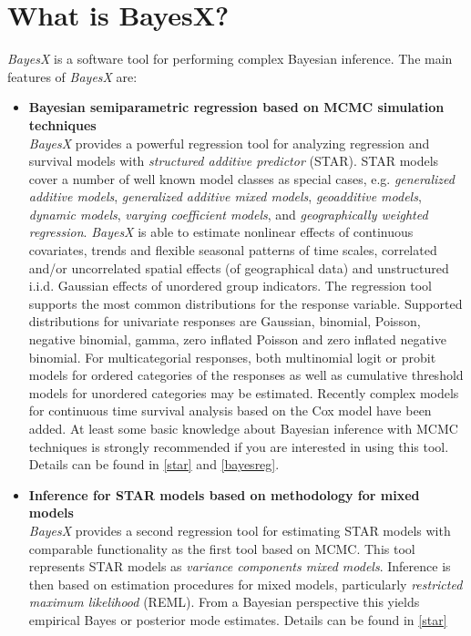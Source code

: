 \chapter{What is BayesX?}

{\em BayesX} is a software tool for performing complex Bayesian
inference. The main features of {\em BayesX} are:
\begin{itemize}
\item {\bf Bayesian semiparametric regression based on MCMC simulation techniques} \\
{\em BayesX} provides a powerful regression tool for analyzing
regression and survival models with {\em structured additive
predictor} (STAR). STAR models cover a number of well known model
classes as special cases, e.g. {\em generalized additive models},
{\em generalized additive mixed models}, {\em geoadditive models},
{\em dynamic models}, {\em varying coefficient models}, and {\em
geographically weighted regression}. {\em BayesX} is able to
estimate nonlinear effects of continuous covariates, trends and
flexible seasonal patterns of time scales, correlated and/or
uncorrelated spatial effects (of geographical data) and
unstructured i.i.d. Gaussian effects of unordered group
indicators. The regression tool  supports the most common
distributions for the response variable. Supported distributions
for univariate responses are Gaussian, binomial, Poisson, negative
binomial, gamma, zero inflated Poisson and zero inflated negative binomial. 
For multicategorial responses, both
multinomial logit or probit models for ordered categories of the
responses as well as cumulative threshold models for unordered
categories may be estimated. Recently complex models for
continuous time survival analysis based on the Cox model have been
added. At least some basic knowledge about Bayesian inference with
MCMC techniques is strongly recommended if you are interested in
using this tool. Details can be found in \autoref{star} and
\autoref{bayesreg}.
\item {\bf Inference for STAR models based on methodology for mixed models} \\
{\em BayesX} provides a second regression tool for estimating STAR
models with comparable functionality as the first tool based on
MCMC. This tool represents STAR models as {\em variance components
mixed models}. Inference is then based on estimation procedures
for mixed models, particularly {\em restricted maximum likelihood}
(REML). From a Bayesian perspective this yields empirical Bayes or
posterior mode estimates. Details can be found in \autoref{star}

\end{itemize}
